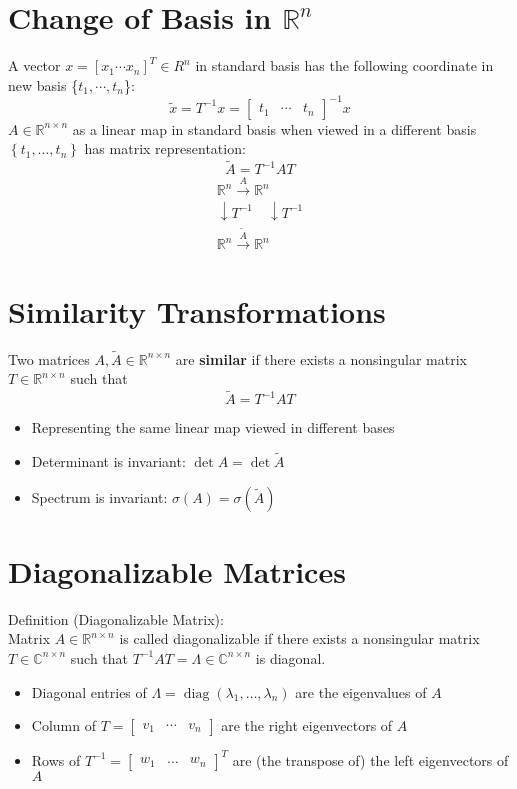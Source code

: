 \documentclass[10pt,a4paper,oneside]{article}
\begin{document}
\section{Change of Basis in $\mathbb{R}^n$}
A vector $x=[x_1\cdots x_n]^T\in R^n$ in standard basis has the following coordinate in new basis \{$t_1,\cdots,t_n$\}:
\[
\tilde{x}=T^{-1} x=\left[\begin{array}{lll}{t_{1}} & {\cdots} & {t_{n}}\end{array}\right]^{-1} x
\]
$A \in \mathbb{R}^{n \times n}$ as a linear map in standard basis when viewed in a different
basis $\left\{t_{1}, \ldots, t_{n}\right\}$ has matrix representation:
\[
\tilde{A}=T^{-1} A T
\]
\[
\begin{array}{l}{\mathbb{R}^{n} \stackrel{A}{\longrightarrow} \mathbb{R}^{n}} \\ {\downarrow T^{-1} \quad\downarrow T^{-1}} \\ {\mathbb{R}^{n} \stackrel{\tilde{A}}{\longrightarrow} \mathbb{R}^{n}}\end{array}
\]
\section{Similarity Transformations}
Two matrices $A, \tilde{A} \in \mathbb{R}^{n \times n}$ are {\bfseries similar} if there exists a nonsingular matrix $T \in \mathbb{R}^{n \times n}$ such that
\[
\tilde{A}=T^{-1} A T
\]
\begin{itemize}
\item Representing the same linear map viewed in different bases
\item Determinant is invariant: $\det A=\det \tilde{A}$
\item Spectrum is invariant: $\sigma(A)=\sigma(\tilde{A})$
\end{itemize}
\section{Diagonalizable Matrices}
Definition (Diagonalizable Matrix):\\
Matrix $A\in\mathbb{R}^{n\times n}$ is called diagonalizable if there exists a nonsingular matrix $T\in\mathbb{C}^{n\times n}$ such that $T^{-1}AT=\Lambda\in\mathbb{C}^{n\times n}$ is diagonal.
\begin{itemize}
\item Diagonal entries of $\Lambda=\operatorname{diag}\left(\lambda_{1}, \ldots, \lambda_{n}\right)$ are the eigenvalues of $A$
\item Column of $T=\left[\begin{array}{ccc}{v_{1}} & {\cdots} & {v_{n}}\end{array}\right]$ are the right eigenvectors of $A$
\item Rows of $T^{-1}=\left[\begin{array}{ccc}{w_{1}} & {\dots} & {w_{n}}\end{array}\right]^{T}$ are (the transpose of) the left
eigenvectors of $A$
\end{itemize}
\end{document}
